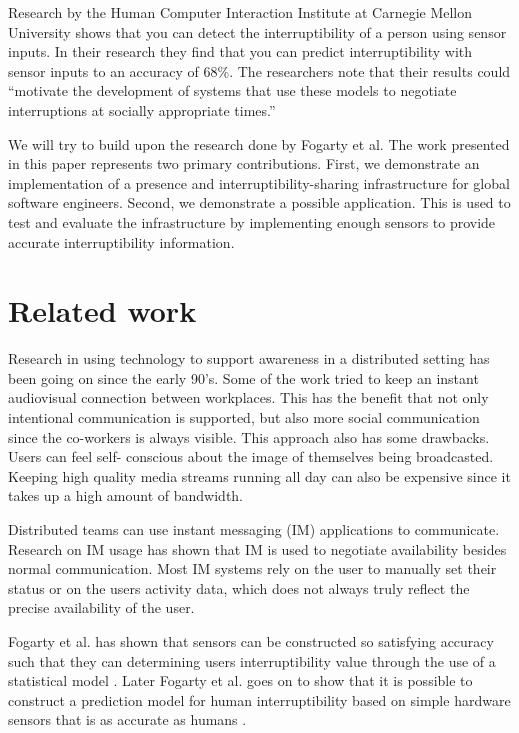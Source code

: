 \documentclass{sigchi}
\begin{document}
Research by the Human Computer Interaction Institute at Carnegie Mellon University \cite{Fogarty:2005:PHI:1057237.1057243} shows that you can detect the interruptibility of a person using sensor inputs.
In their research they find that you can predict interruptibility with sensor inputs to an accuracy of 68\%.
The researchers note that their results could ``motivate the development of systems that use these models to negotiate interruptions at socially appropriate times.''

We will try to build upon the research done by Fogarty et al.
The work presented in this paper represents two primary contributions.
First, we demonstrate an implementation of a presence and interruptibility-sharing infrastructure for global software engineers.
Second, we demonstrate a possible application. This is used to test and evaluate the infrastructure by implementing enough sensors to provide accurate interruptibility information.

\section{Related work}
Research in using technology to support awareness in a distributed setting has been going on since the early 90’s. Some of the work\cite{bly1993media}\cite{gaver1992realizing}\cite{mantei1991experiences} tried to keep an instant audiovisual connection between workplaces. This has the benefit that not only intentional communication is supported, but also more social communication since the co-workers is always visible. This approach also has some drawbacks. Users can feel self- conscious about the image of themselves being broadcasted. Keeping high quality media streams running all day can also be expensive since it takes up a high amount of bandwidth.

Distributed teams can use instant messaging (IM) applications to communicate. Research on IM usage \cite{nardi2000interaction}\cite{handel2002chat}\cite{tang2001connexus} has shown that IM is used to negotiate availability besides normal communication. Most IM systems rely on the user to manually set their status or on the users activity data, which does not always truly reflect the precise availability of the user.

 Fogarty et al. has shown that sensors can be constructed so satisfying accuracy such that they can determining users interruptibility value through the use of a statistical model \cite{fogarty2004examining}.  Later Fogarty et al. goes on to show that it is possible to construct a prediction model for human interruptibility based on simple hardware sensors that is as accurate as humans \cite{Fogarty:2005:PHI:1057237.1057243}.
\end{document}
